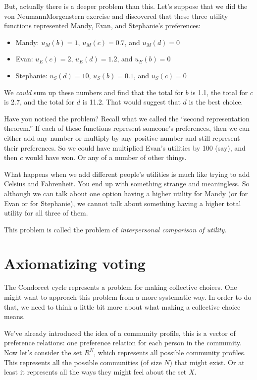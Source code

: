 But, actually there is a deeper problem than this.  Let's suppose that we did the von Neumann\breakslash Morgenstern exercise and discovered that these three utility functions represented Mandy, Evan, and Stephanie's preferences:
\begin{itemize}
    \item Mandy: $u_M(b) = 1$, $u_M(c) = 0.7$, and $u_M(d) = 0$
    \item Evan: $u_E(c) = 2$, $u_E(d) = 1.2$, and $u_E(b) = 0$
    \item Stephanie: $u_S(d) = 10$, $u_S(b) = 0.1$, and $u_S(c) = 0$
\end{itemize}
We {\it could} sum up these numbers and find that the total for $b$ is 1.1, the total for $c$ is 2.7, and the total for $d$ is 11.2. That would suggest that $d$ is the best choice.

Have you noticed the problem?  Recall what we called the ``second representation theorem.''  If each of these functions represent someone's preferences, then we can either add any number or multiply by any positive number and still represent their preferences.  So we could have multiplied Evan's utilities by 100 (say), and then $c$ would have won.  Or any of a number of other things. 

What happens when we add different people's utilities is much like trying to add Celsius and Fahrenheit.  You end up with something strange and meaningless.  So although we can talk about one option having a higher utility for Mandy (or for Evan or for Stephanie), we cannot talk about something having a higher total utility for all three of them.

This problem is called the problem of {\it interpersonal comparison of utility}.

\section{Axiomatizing voting}

The Condorcet cycle represents a problem for making collective choices. One might want to approach this problem from a more systematic way.  In order to do that, we need to think a little bit more about what making a collective choice means.

We've already introduced the idea of a community profile, this is a vector of preference relations: one preference relation for each person in the community.  Now let's consider the set $R^N$, which represents all possible community profiles. This represents all the possible communities (of size $N$) that might exist. Or at least it represents all the ways they might feel about the set $X$.

